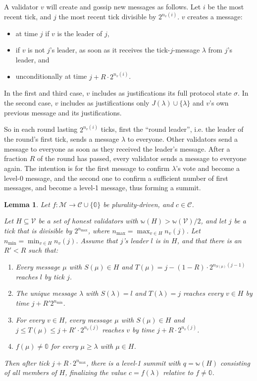 \documentclass[12pt]{article}
\newtheorem{lemma}{Lemma}
\begin{document}
A validator $v$ will create and gossip new messages as follows. Let $i$ be the most recent tick, and $j$ the most recent tick divisible by $2^{n_v(i)}$. $v$ creates a message:
\begin{itemize}
    \item at time $j$ if $v$ is the leader of $j$,
    \item if $v$ is not $j$'s leader, as soon as it receives the tick-$j$-message $\lambda$ from $j$'s leader, and
    \item unconditionally at time $j + R \cdot 2^{n_v(i)}$.
\end{itemize}
In the first and third case, $v$ includes as justifications its full protocol state $\sigma$. In the second case, $v$ includes as justifications only $J(\lambda) \cup \{\lambda\}$ and $v$'s own previous message and its justifications.

So in each round lasting $2^{n_v(i)}$ ticks, first the ``round leader'', i.e. the leader of the round's first tick, sends a message $\lambda$ to everyone. Other validators send a message to everyone as soon as they received the leader's message. After a fraction $R$ of the round has passed, every validator sends a message to everyone again. The intention is for the first message to confirm $\lambda$'s vote and become a level-0 message, and the second one to confirm a sufficient number of first messages, and become a level-1 message, thus forming a summit.

\begin{lemma}\label{basicLiveness}
  Let $f : \mathcal{M} \rightarrow \mathcal{C} \cup \{ \mathbb{0} \}$ be plurality-driven, and $c \in \mathcal{C}$.

  Let $H \subseteq \mathcal{V}$ be a set of honest validators with $\mathbb{w}(H) > \mathbb{w}(\mathcal{V}) / 2$, and let $j$ be a tick that is divisible by $2^{n_{\max}}$, where $n_{\max} = \max_{v \in H} n_v(j)$. Let $n_{\min} = \min_{v \in H} n_v(j)$. Assume that $j$'s leader $l$ is in $H$, and that there is an $R' < R$ such that:
  \begin{enumerate}
    \item Every message $\mu$ with $S(\mu) \in H$ and $T(\mu) = j - (1 - R) \cdot 2^{n_{S(\mu)}(j - 1)}$ reaches $l$ by tick $j$.
    \item The unique message $\lambda$ with $S(\lambda) = l$ and $T(\lambda) = j$ reaches every $v \in H$ by time $j + R' 2^{n_{\min}}$.
    \item For every $v \in H$, every message $\mu$ with $S(\mu) \in H$ and $j \leq T(\mu) \leq j + R' \cdot 2^{n_v(j)}$ reaches $v$ by time $j + R \cdot 2^{n_v(j)}$.
    \item $f(\mu) \neq \mathbb{0}$ for every $\mu \geq \lambda$ with $\mu \in H$.
  \end{enumerate}
  Then after tick $j + R \cdot 2^{n_{\max}}$, there is a level-1 summit with $q = \mathbb{w}(H)$ consisting of all members of $H$, finalizing the value $c = f(\lambda)$ relative to $f \neq \mathbb{0}$.
\end{lemma}
\end{document}

